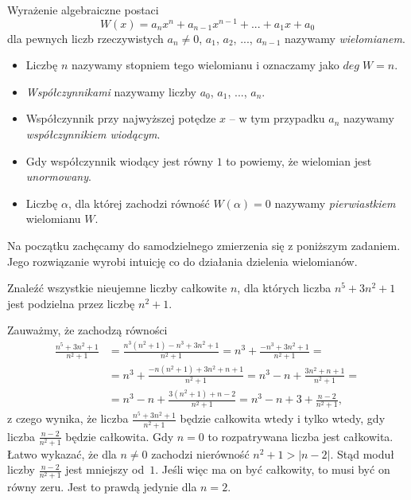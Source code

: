 


\noindent
Wyrażenie algebraiczne postaci
\[
    W(x) = a_nx^n + a_{n - 1}x^{n - 1} + ... + a_1x + a_0
\]
dla pewnych liczb rzeczywistych $a_n \neq 0$, $a_1$, $a_2$, ..., $a_{n - 1}$ nazywamy \textit{wielomianem}.
\begin{itemize}
    \item Liczbę $n$ nazywamy stopniem tego wielomianu i oznaczamy jako $deg \; W = n$.

    \item \textit{Współczynnikami} nazywamy liczby $a_0$, $a_1$, ..., $a_n$.

    \item Współczynnik przy najwyższej potędze $x$ -- w tym przypadku $a_n$ nazywamy \textit{współczynnikiem wiodącym}.

    \item Gdy współczynnik wiodący jest równy $1$ to powiemy, że wielomian jest \textit{unormowany}.

    \item Liczbę $\alpha$, dla której zachodzi równość $W(\alpha) = 0$ nazywamy \textit{pierwiastkiem} wielomianu $W$.
\end{itemize}

\vspace{5px}

\noindent 
Na początku zachęcamy do samodzielnego zmierzenia się z poniższym zadaniem. Jego rozwiązanie wyrobi intuicję co do działania dzielenia wielomianów.

\vspace{5px}


\noindent
Znaleźć wszystkie nieujemne liczby całkowite $n$, dla których liczba $n^5 + 3n^2 + 1$ jest podzielna przez liczbę $n^2 + 1$.

\vspace{5px}


\noindent
Zauważmy, że zachodzą równości
\begin{align*}
    \frac{n^5 + 3n^2 + 1}{n^2 + 1} &= 
    \frac{n^3(n^2 + 1) - n^3 + 3n^2 + 1}{n^2 + 1} 
    = n^3 + \frac{- n^3 + 3n^2 + 1}{n^2 + 1} = \\
    &= n^3 + \frac{-n(n^2 + 1) + 3n^2 + n + 1}{n^2 + 1} 
    = n^3 - n + \frac{3n^2 + n + 1}{n^2 + 1} = \\
    &= n^3 - n + \frac{3(n^2 + 1) + n - 2}{n^2 + 1}
    =  n^3 - n + 3 + \frac{n - 2}{n^2 + 1}, 
\end{align*} 
z czego wynika, że liczba $\frac{n^5 + 3n^2 + 1}{n^2 + 1}$ będzie całkowita wtedy i tylko wtedy, gdy liczba $\frac{n - 2}{n^2 + 1}$ będzie całkowita. Gdy $n = 0$ to rozpatrywana liczba jest całkowita. Łatwo wykazać, że dla $n \neq 0$ zachodzi nierówność $n^2 + 1 > |n - 2|$. Stąd moduł liczby $\frac{n - 2}{n^2 + 1}$ jest mniejszy od~$1$. Jeśli więc ma on być całkowity, to musi być on równy zeru. Jest to prawdą jedynie dla $n = 2$.


